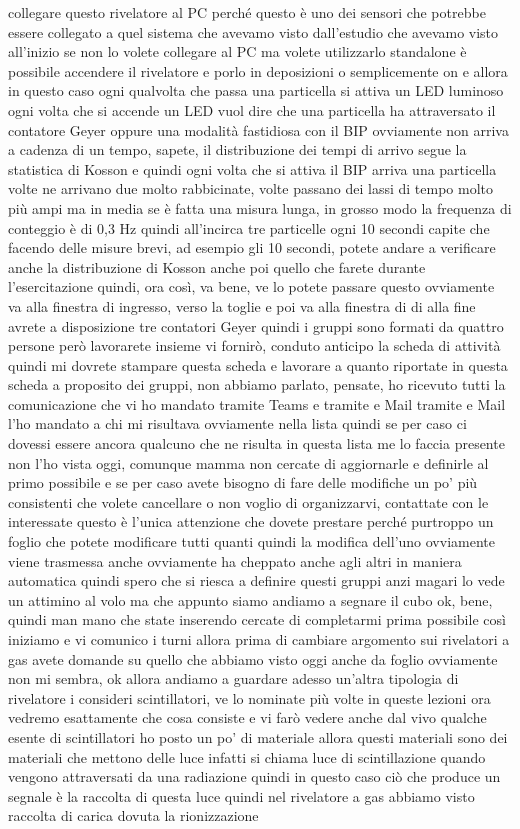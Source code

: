 {collegare questo rivelatore al PC perché questo è uno dei sensori che potrebbe essere collegato a quel sistema che avevamo visto dall'estudio che avevamo visto all'inizio se non lo volete collegare al PC ma volete utilizzarlo standalone è possibile accendere il rivelatore e porlo in deposizioni o semplicemente on e allora in questo caso ogni qualvolta che passa una particella si attiva un LED luminoso ogni volta che si accende un LED vuol dire che una particella ha attraversato il contatore Geyer oppure una modalità fastidiosa con il BIP ovviamente non arriva a cadenza di un tempo, sapete, il distribuzione dei tempi di arrivo segue la statistica di Kosson e quindi ogni volta che si attiva il BIP arriva una particella volte ne arrivano due molto rabbicinate, volte passano dei lassi di tempo molto più ampi ma in media se è fatta una misura lunga, in grosso modo la frequenza di conteggio è di 0,3 Hz quindi all'incirca tre particelle ogni 10 secondi capite che facendo delle misure brevi, ad esempio gli 10 secondi, potete andare a verificare anche la distribuzione di Kosson anche poi quello che farete durante l'esercitazione quindi, ora così, va bene, ve lo potete passare questo ovviamente va alla finestra di ingresso, verso la toglie e poi va alla finestra di di alla fine avrete a disposizione tre contatori Geyer quindi i gruppi sono formati da quattro persone però lavorarete insieme vi fornirò, conduto anticipo la scheda di attività quindi mi dovrete stampare questa scheda e lavorare a quanto riportate in questa scheda a proposito dei gruppi, non abbiamo parlato, pensate, ho ricevuto tutti la comunicazione che vi ho mandato tramite Teams e tramite e Mail tramite e Mail l'ho mandato a chi mi risultava ovviamente nella lista quindi se per caso ci dovessi essere ancora qualcuno che ne risulta in questa lista me lo faccia presente non l'ho vista oggi, comunque mamma non cercate di aggiornarle e definirle al primo possibile e se per caso avete bisogno di fare delle modifiche un po' più consistenti che volete cancellare o non voglio di organizzarvi, contattate con le interessate questo è l'unica attenzione che dovete prestare perché purtroppo un foglio che potete modificare tutti quanti quindi la modifica dell'uno ovviamente viene trasmessa anche ovviamente ha cheppato anche agli altri in maniera automatica quindi spero che si riesca a definire questi gruppi anzi magari lo vede un attimino al volo ma che appunto siamo andiamo a segnare il cubo ok, bene, quindi man mano che state inserendo cercate di completarmi prima possibile così iniziamo e vi comunico i turni allora prima di cambiare argomento sui rivelatori a gas avete domande su quello che abbiamo visto oggi anche da foglio ovviamente non mi sembra, ok allora andiamo a guardare adesso un'altra tipologia di rivelatore i consideri scintillatori, ve lo nominate più volte in queste lezioni ora vedremo esattamente che cosa consiste e vi farò vedere anche dal vivo qualche esente di scintillatori ho posto un po' di materiale allora questi materiali sono dei materiali che mettono delle luce infatti si chiama luce di scintillazione quando vengono attraversati da una radiazione quindi in questo caso ciò che produce un segnale è la raccolta di questa luce quindi nel rivelatore a gas abbiamo visto raccolta di carica dovuta la rionizzazione }
